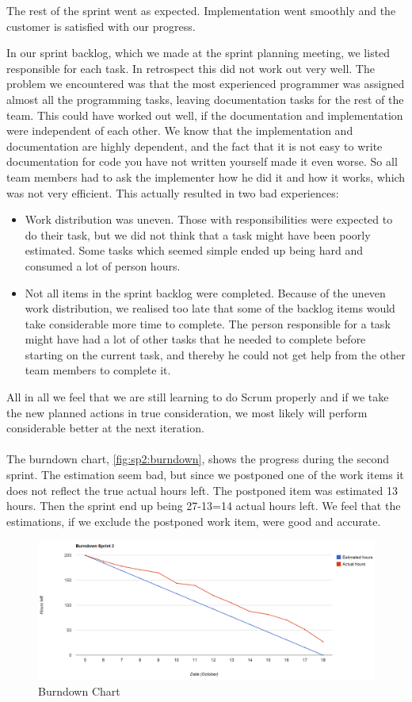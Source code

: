 {{The rest of the sprint went as expected. Implementation went smoothly and the customer is satisfied with our progress.

In our sprint backlog, which we made at the sprint planning meeting, we listed responsible for each task. In retrospect this did not work out very well. The problem we encountered was that the most experienced programmer was assigned almost all the programming tasks, leaving documentation tasks for the rest of the team. This could have worked out well, if the documentation and implementation were independent of each other. We know that the implementation and documentation are highly dependent, and the fact that it is not easy to write documentation for code you have not written yourself made it even worse. So all team members had to ask the implementer how he did it and how it works, which was not very efficient. 
This actually resulted in two bad experiences:
\begin{itemize}
\item Work distribution was uneven. Those with responsibilities were expected to do their task, but we did not think that a task might have been poorly estimated. Some tasks which seemed simple ended up being hard and consumed a lot of person hours.
\item Not all items in the sprint backlog were completed. Because of the uneven work distribution, we realised too late that some of the backlog items would take considerable more time to complete. The person responsible for a task might have had a lot of other tasks that he needed to complete before starting on the current task, and thereby he could not get help from the other team members to complete it.
\end{itemize} 
 All in all we feel that we are still learning to do Scrum properly and if we take the new planned actions in true consideration, we most likely will perform considerable better at the next iteration. 
\\
\\
The burndown chart, \autoref{fig:sp2:burndown}, shows the progress during the second sprint. The estimation seem bad, but since we postponed one of the work items it does not reflect the true actual hours left. The postponed item was estimated 13 hours. Then the sprint end up being 27-13=14 actual hours left. We feel that the estimations, if we exclude the postponed work item, were good and accurate.
\begin{figure}[!htb]
	\includegraphics[width=\textwidth]{./sprints/img/burndown_chart_s2}
	\caption{Burndown Chart\label{fig:sp2:burndown}}
\end{figure}



}}
